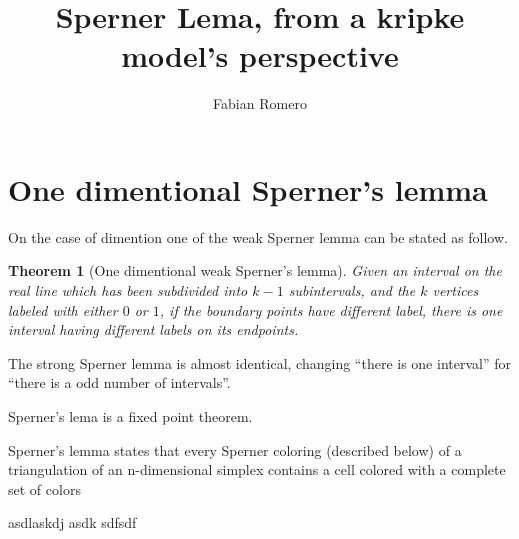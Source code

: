 \documentclass{article}
\title{Sperner Lema, from a kripke model's perspective}
\author{Fabian Romero}
\date{}
\newtheorem{theorem}{Theorem}[section]
\theoremstyle{definition}
\theoremstyle{remark}
\begin{document}
\maketitle


\section{One dimentional Sperner's lemma }

On the case of dimention one of the weak Sperner lemma can be stated as follow.

\begin{theorem}[One dimentional weak Sperner's lemma]
    Given an interval on the real line which has been subdivided into $k-1$ subintervals, and the $k$ vertices labeled with either $0$ or $1$, if the boundary points have different label, there is one interval having different labels on its endpoints.\\
\end{theorem}



The strong Sperner lemma is almost identical, changing ``there is one interval'' for ``there is a odd number of intervals''.





Sperner's lema is a fixed point theorem.

Sperner's lemma states that every Sperner coloring (described below) of a triangulation of an n-dimensional simplex contains a cell colored with a complete set of colors

asdlaskdj asdk  \cite{Huang_onthe} sdfsdf
\end{document}
